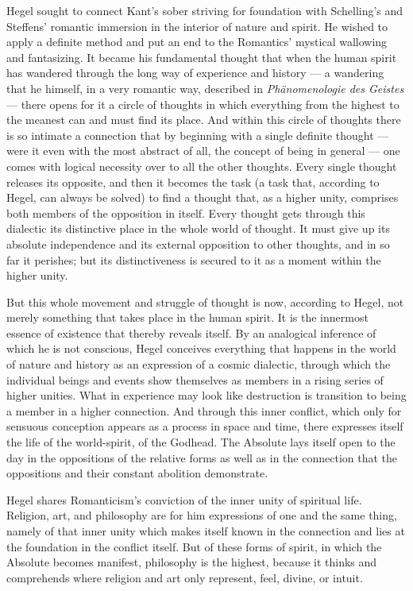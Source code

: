 \documentclass[12pt,a4paper]{book}
\newcommand{\opage}[1]{\marginnote{\footnotesize\textit{[#1]}}}
\begin{document}
Hegel sought to connect Kant's sober striving for foundation with Schelling's and Steffens'
romantic immersion in the interior of nature and spirit. He wished to apply a definite
method and put an end to the Romantics' mystical wallowing and fantasizing. It became his
fundamental thought that when the human spirit has wandered through the long way of
experience and history --- a wandering that he himself, in a very romantic way, described in
\emph{Phänomenologie des Geistes} --- there opens for it a circle of thoughts in which
everything from the highest to the meanest can and must find its place. And within this
circle of thoughts there is so intimate a connection that by beginning with a single
definite thought --- were it even with the most abstract of all, the concept of being in
general --- one comes with logical necessity over to all the other thoughts. Every single
thought releases its opposite, and then it becomes the task (a task that, according to
Hegel, can always be solved) to find a thought that, as a higher unity, comprises both
members of the opposition in itself. Every thought gets through this dialectic its
distinctive place in the whole world of thought. It must give up its absolute independence
and its external opposition to other thoughts, and in so far it perishes; but its
distinctiveness is secured to it as a moment within the higher unity.

But this whole movement and struggle of thought is now, \opage{129}according to Hegel, not merely
something that takes place in the human spirit. It is the innermost essence of existence
that thereby reveals itself. By an analogical inference of which he is not conscious, Hegel
conceives everything that happens in the world of nature and history as an expression of a
cosmic dialectic, through which the individual beings and events show themselves as members
in a rising series of higher unities. What in experience may look like destruction is
transition to being a member in a higher connection. And through this inner conflict, which
only for sensuous conception appears as a process in space and time, there expresses itself
the life of the world-spirit, of the Godhead. The Absolute lays itself open to the day in
the oppositions of the relative forms as well as in the connection that the oppositions and
their constant abolition demonstrate.

Hegel shares Romanticism's conviction of the inner unity of spiritual life. Religion, art,
and philosophy are for him expressions of one and the same thing, namely of that inner unity
which makes itself known in the connection and lies at the foundation in the conflict
itself. But of these forms of spirit, in which the Absolute becomes manifest, philosophy is
the highest, because it thinks and comprehends where religion and art only represent, feel,
divine, or intuit.
\end{document}
